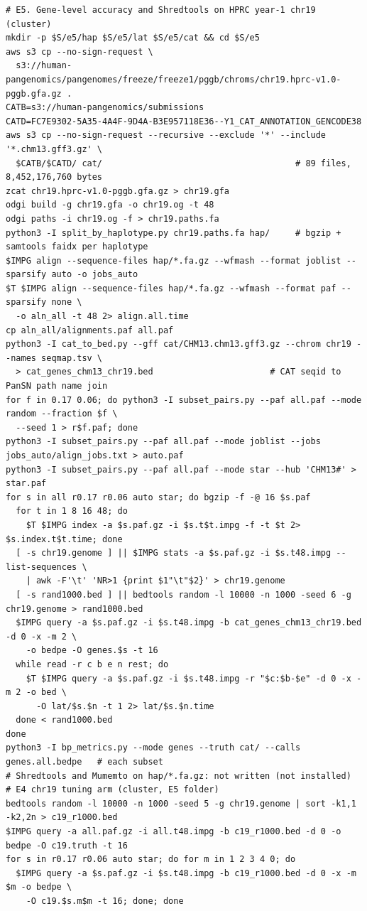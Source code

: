 {\begin{verbatim}
# E5. Gene-level accuracy and Shredtools on HPRC year-1 chr19 (cluster)
mkdir -p $S/e5/hap $S/e5/lat $S/e5/cat && cd $S/e5
aws s3 cp --no-sign-request \
  s3://human-pangenomics/pangenomes/freeze/freeze1/pggb/chroms/chr19.hprc-v1.0-pggb.gfa.gz .
CATB=s3://human-pangenomics/submissions
CATD=FC7E9302-5A35-4A4F-9D4A-B3E957118E36--Y1_CAT_ANNOTATION_GENCODE38
aws s3 cp --no-sign-request --recursive --exclude '*' --include '*.chm13.gff3.gz' \
  $CATB/$CATD/ cat/                                      # 89 files, 8,452,176,760 bytes
zcat chr19.hprc-v1.0-pggb.gfa.gz > chr19.gfa
odgi build -g chr19.gfa -o chr19.og -t 48
odgi paths -i chr19.og -f > chr19.paths.fa
python3 -I split_by_haplotype.py chr19.paths.fa hap/     # bgzip + samtools faidx per haplotype
$IMPG align --sequence-files hap/*.fa.gz --wfmash --format joblist --sparsify auto -o jobs_auto
$T $IMPG align --sequence-files hap/*.fa.gz --wfmash --format paf --sparsify none \
  -o aln_all -t 48 2> align.all.time
cp aln_all/alignments.paf all.paf
python3 -I cat_to_bed.py --gff cat/CHM13.chm13.gff3.gz --chrom chr19 --names seqmap.tsv \
  > cat_genes_chm13_chr19.bed                       # CAT seqid to PanSN path name join
for f in 0.17 0.06; do python3 -I subset_pairs.py --paf all.paf --mode random --fraction $f \
  --seed 1 > r$f.paf; done
python3 -I subset_pairs.py --paf all.paf --mode joblist --jobs jobs_auto/align_jobs.txt > auto.paf
python3 -I subset_pairs.py --paf all.paf --mode star --hub 'CHM13#' > star.paf
for s in all r0.17 r0.06 auto star; do bgzip -f -@ 16 $s.paf
  for t in 1 8 16 48; do
    $T $IMPG index -a $s.paf.gz -i $s.t$t.impg -f -t $t 2> $s.index.t$t.time; done
  [ -s chr19.genome ] || $IMPG stats -a $s.paf.gz -i $s.t48.impg --list-sequences \
    | awk -F'\t' 'NR>1 {print $1"\t"$2}' > chr19.genome
  [ -s rand1000.bed ] || bedtools random -l 10000 -n 1000 -seed 6 -g chr19.genome > rand1000.bed
  $IMPG query -a $s.paf.gz -i $s.t48.impg -b cat_genes_chm13_chr19.bed -d 0 -x -m 2 \
    -o bedpe -O genes.$s -t 16
  while read -r c b e n rest; do
    $T $IMPG query -a $s.paf.gz -i $s.t48.impg -r "$c:$b-$e" -d 0 -x -m 2 -o bed \
      -O lat/$s.$n -t 1 2> lat/$s.$n.time
  done < rand1000.bed
done
python3 -I bp_metrics.py --mode genes --truth cat/ --calls genes.all.bedpe   # each subset
# Shredtools and Mumemto on hap/*.fa.gz: not written (not installed)
# E4 chr19 tuning arm (cluster, E5 folder)
bedtools random -l 10000 -n 1000 -seed 5 -g chr19.genome | sort -k1,1 -k2,2n > c19_r1000.bed
$IMPG query -a all.paf.gz -i all.t48.impg -b c19_r1000.bed -d 0 -o bedpe -O c19.truth -t 16
for s in r0.17 r0.06 auto star; do for m in 1 2 3 4 0; do
  $IMPG query -a $s.paf.gz -i $s.t48.impg -b c19_r1000.bed -d 0 -x -m $m -o bedpe \
    -O c19.$s.m$m -t 16; done; done


\end{verbatim}}
